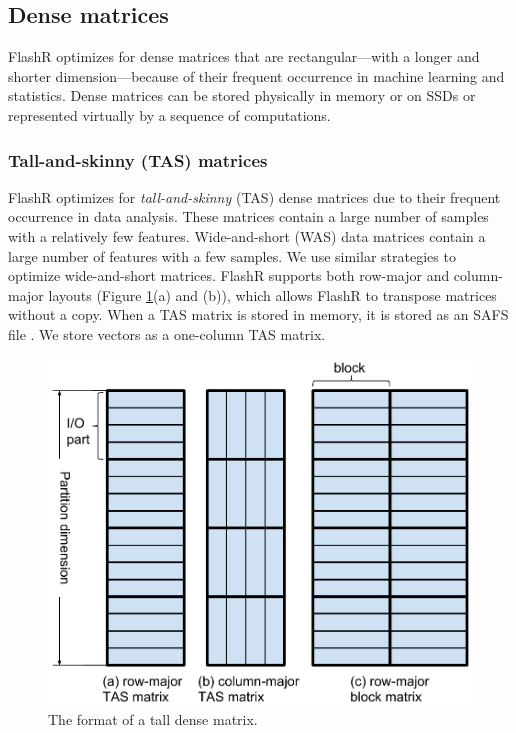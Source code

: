 \subsection{Dense matrices}
FlashR optimizes for dense matrices that are rectangular---with
a longer and shorter dimension---because of their frequent occurrence
in machine learning and statistics. Dense matrices can be stored
physically in memory or on SSDs or represented virtually by a sequence of
computations.

\subsubsection{Tall-and-skinny (TAS) matrices}
FlashR optimizes for \textit{tall-and-skinny} (TAS) dense matrices
due to their frequent occurrence in data analysis. These matrices contain
a large number of samples with a relatively few features. Wide-and-short
(WAS) data matrices contain a large number of features with a few samples.
We use similar strategies to optimize wide-and-short matrices. FlashR
supports both row-major and column-major layouts (Figure \ref{fig:den_mat}(a)
and (b)), which allows FlashR to transpose matrices without a copy.
When a TAS matrix is stored in memory, it is stored as an SAFS file
\cite{safs}. We store vectors as a one-column TAS matrix.

\begin{figure}
	\centering
	\includegraphics[scale=0.4]{FlashMatrix_figs/dense_matrix2.pdf}
	\caption{The format of a tall dense matrix.}
	\label{fig:den_mat}
  \vspace{-12pt}
\end{figure}

